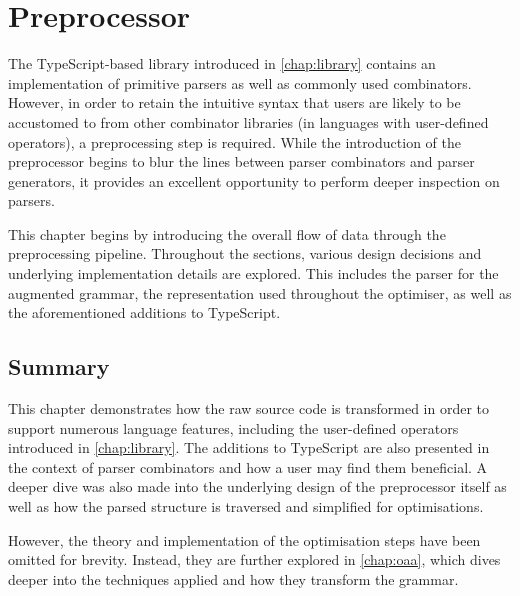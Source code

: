 \chapter{Preprocessor}
\label{chap:preprocessor}

The TypeScript-based library introduced in \autoref{chap:library} contains an implementation of primitive parsers as well as commonly used combinators.
However, in order to retain the intuitive syntax that users are likely to be accustomed to from other combinator libraries (in languages with user-defined operators), a preprocessing step is required.
While the introduction of the preprocessor begins to blur the lines between parser combinators and parser generators, it provides an excellent opportunity to perform deeper inspection on parsers.

This chapter begins by introducing the overall flow of data through the preprocessing pipeline.
Throughout the sections, various design decisions and underlying implementation details are explored.
This includes the parser for the augmented grammar, the representation used throughout the optimiser, as well as the aforementioned additions to TypeScript.






\section*{Summary}
This chapter demonstrates how the raw \tsext source code is transformed in order to support numerous language features, including the user-defined operators introduced in \autoref{chap:library}.
The additions to TypeScript are also presented in the context of parser combinators and how a user may find them beneficial.
A deeper dive was also made into the underlying design of the preprocessor itself as well as how the parsed structure is traversed and simplified for optimisations.

However, the theory and implementation of the optimisation steps have been omitted for brevity.
Instead, they are further explored in \autoref{chap:oaa}, which dives deeper into the techniques applied and how they transform the grammar.

